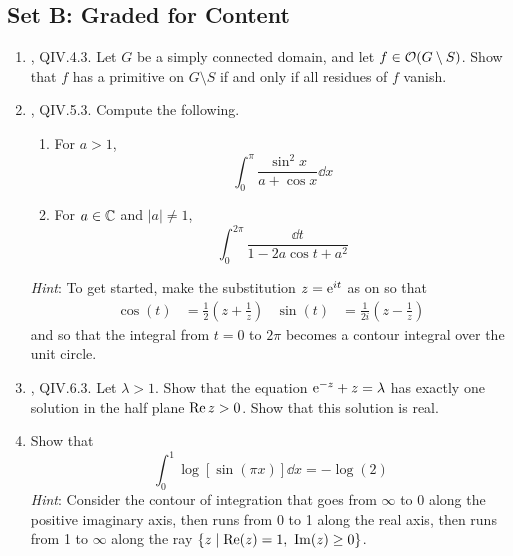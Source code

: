 \documentclass[../psets.tex]{subfiles}
\begin{document}
\subsection*{Set B: Graded for Content}
\begin{enumerate}[label={\textbf{\arabic*.}}]
    \item \textcite{bib:FischerLieb}, QIV.4.3. Let $G$ be a simply connected domain, and let $f\in\mO(G\setminus S)$. Show that $f$ has a primitive on $G\setminus S$ if and only if all residues of $f$ vanish.
    \item \textcite{bib:FischerLieb}, QIV.5.3. Compute the following.
    \begin{enumerate}
        \item For $a>1$,
        \begin{equation*}
            \int_0^\pi\frac{\sin^2x}{a+\cos x}\dd{x}
        \end{equation*}
        \item For $a\in\C$ and $|a|\neq 1$,
        \begin{equation*}
            \int_0^{2\pi}\frac{\dd{t}}{1-2a\cos t+a^2}
        \end{equation*}
    \end{enumerate}
    \emph{Hint}: To get started, make the substitution $z=\e[it]$ as on \textcite[127]{bib:FischerLieb} so that
    \begin{align*}
        \cos(t) &= \frac{1}{2}\left( z+\frac{1}{z} \right)&
        \sin(t) &= \frac{1}{2i}\left( z-\frac{1}{z} \right)
    \end{align*}
    and so that the integral from $t=0$ to $2\pi$ becomes a contour integral over the unit circle.
    \item \textcite{bib:FischerLieb}, QIV.6.3. Let $\lambda>1$. Show that the equation $\e[-z]+z=\lambda$ has exactly one solution in the half plane $\re z>0$. Show that this solution is real.
    \item Show that
    \begin{equation*}
        \int_0^1\log[\sin(\pi x)]\dd{x} = -\log(2)
    \end{equation*}
    \emph{Hint}: Consider the contour of integration that goes from $\infty$ to 0 along the positive imaginary axis, then runs from 0 to 1 along the real axis, then runs from 1 to $\infty$ along the ray $\{z\mid\re(z)=1,\ \im(z)\geq 0\}$.
\end{enumerate}
\end{document}
